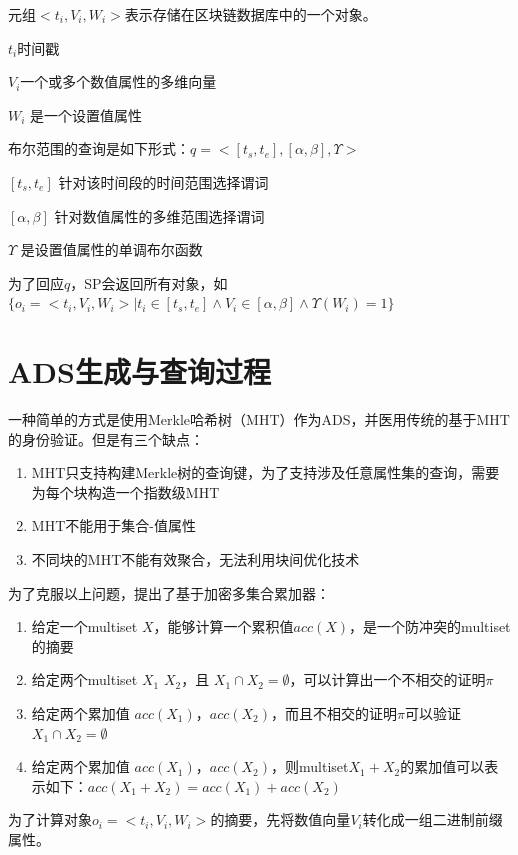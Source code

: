 \documentclass{article}
\begin{document}
元组$<t_i,V_i,W_i>$表示存储在区块链数据库中的一个对象。

$t_i$时间戳

$V_i$一个或多个数值属性的多维向量

$W_i$ 是一个设置值属性

布尔范围的查询是如下形式：$q = <[t_s,t_e],[\alpha,\beta],\Upsilon >$

$[t_s,t_e]$ 针对该时间段的时间范围选择谓词

$[\alpha,\beta]$ 针对数值属性的多维范围选择谓词

$\Upsilon$ 是设置值属性的单调布尔函数

为了回应$q$，SP会返回所有对象，如$\{o_i=<t_i,V_i,W_i>|t_i \in[t_s,t_e] \wedge V_i \in [\alpha,\beta] \wedge \Upsilon(W_i) = 1\}$


\section{ADS生成与查询过程}

一种简单的方式是使用Merkle哈希树（MHT）作为ADS，并医用传统的基于MHT的身份验证。但是有三个缺点：

\begin{enumerate}
    \item MHT只支持构建Merkle树的查询键，为了支持涉及任意属性集的查询，需要为每个块构造一个指数级MHT
    \item MHT不能用于集合-值属性
    \item 不同块的MHT不能有效聚合，无法利用块间优化技术
\end{enumerate}

为了克服以上问题，提出了基于加密多集合累加器：

\begin{enumerate}
    \item 给定一个multiset $X$，能够计算一个累积值$acc(X)$，是一个防冲突的multiset的摘要
    \item 给定两个multiset $X_1$ $X_2$，且 $X_1 \cap X_2 = \emptyset $，可以计算出一个不相交的证明$\pi$
    \item 给定两个累加值 $acc(X_1)$，$acc(X_2)$，而且不相交的证明$\pi$可以验证$X_1 \cap X_2 = \emptyset $
    \item 给定两个累加值 $acc(X_1)$，$acc(X_2)$，则multiset$X_1+X_2$的累加值可以表示如下：$acc(X_1+X_2) = acc(X_1)+acc(X_2)$
\end{enumerate}

为了计算对象$o_i=<t_i,V_i,W_i>$的摘要，先将数值向量$V_i$转化成一组二进制前缀属性。
\end{document}
